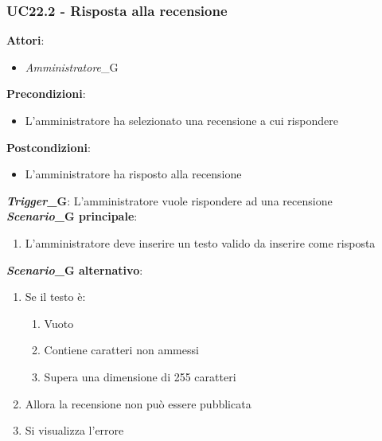 \subsubsection{UC22.2 - Risposta alla recensione}\label{usecase:22_2}
\textbf{Attori}:
\begin{itemize}
    \item \textit{Amministratore}_G
\end{itemize}
\textbf{Precondizioni}:
\begin{itemize}
    \item L'amministratore ha selezionato una recensione a cui rispondere
\end{itemize}
\textbf{Postcondizioni}:
\begin{itemize}
    \item L'amministratore ha risposto alla recensione
\end{itemize}
\textbf{\textit{Trigger}_G}:
L'amministratore vuole rispondere ad una recensione\\
\textbf{\textit{Scenario}_G principale}:
\begin{enumerate}
    \item L'amministratore deve inserire un testo valido da inserire come risposta
\end{enumerate}
\textbf{\textit{Scenario}_G alternativo}:
\begin{enumerate}
    \item Se il testo è: 
    \begin{enumerate}
        \item Vuoto
        \item Contiene caratteri non ammessi
        \item Supera una dimensione di 255 caratteri
    \end{enumerate}
    \item Allora la recensione non può essere pubblicata
    \item Si visualizza l'errore
\end{enumerate}